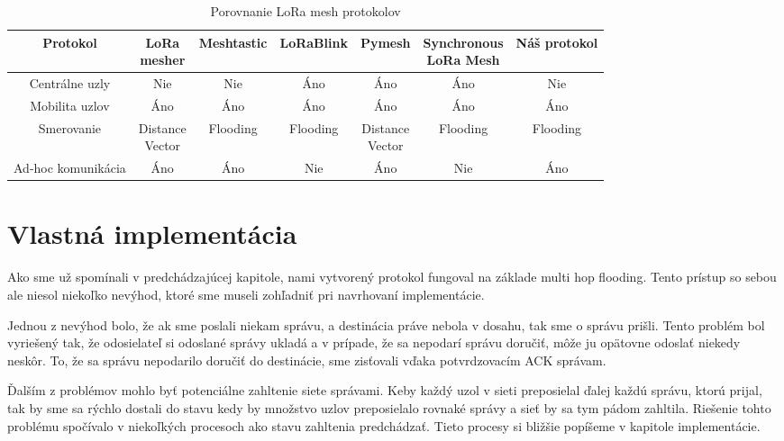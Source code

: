 \documentclass[slovak,master]{diploma}
\renewcommand{\thefootnote}{\arabic{footnote}}
\begin{document}
\renewcommand{\thefootnote}{\fnsymbol{footnote}}
\begin{table}[!h]
	\centering
  \small
  \setlength\tabcolsep{3pt}
	\caption[Porovnanie LoRa mesh protokolov]{Porovnanie LoRa mesh protokolov}
  \begin{tabular}{c|c|c|c|c|c|c}
    \toprule
    Protokol  & \makecell{LoRa \\ mesher} & Meshtastic & LoRaBlink & Pymesh & \makecell{Synchronous\\ LoRa Mesh} & Náš protokol\\
    \midrule
    Centrálne uzly & Nie & Nie & Áno & Áno & Áno & Nie \\
    \hline
    Mobilita uzlov & Áno\footnotemark[7] & Áno & Áno\footnotemark[1] & Áno\footnotemark[7] & Áno\footnotemark[1] & Áno\\
    \hline
    Smerovanie & \makecell{Distance \\ Vector} & Flooding & Flooding & \makecell{Distance \\ Vector} & Flooding & Flooding\\
    \hline
    Ad-hoc komunikácia & Áno & Áno & Nie & Áno & Nie & Áno \\
    \midrule
  \end{tabular}
  \label{tab:compar}
\end{table}
\renewcommand{\thefootnote}{\arabic{footnote}}

\chapter{Vlastná implementácia}
Ako sme už spomínali v predchádzajúcej kapitole, nami vytvorený protokol fungoval na základe multi hop flooding. Tento prístup so sebou ale niesol 
niekoľko nevýhod, ktoré sme museli zohľadniť pri navrhovaní implementácie.

Jednou z nevýhod bolo, že ak sme poslali niekam správu, a destinácia práve nebola v dosahu, tak sme o správu prišli. Tento problém bol vyriešený tak, 
že odosielateľ si odoslané správy ukladá a v prípade, že sa nepodarí správu doručiť, môže ju opätovne 
odoslať niekedy neskôr. To, že sa správu nepodarilo doručiť do destinácie, sme zisťovali vďaka potvrdzovacím ACK správam. 

Ďalším z problémov mohlo byť potenciálne zahltenie siete správami. Keby každý uzol v sieti preposielal ďalej každú správu, ktorú prijal, tak by sme sa rýchlo dostali 
do stavu kedy by množstvo uzlov preposielalo rovnaké správy a sieť by sa tym pádom zahltila.
Riešenie tohto problému spočívalo v niekoľkých procesoch ako stavu zahltenia predchádzať. Tieto procesy si bližšie popíšeme v kapitole implementácie.
\end{document}
